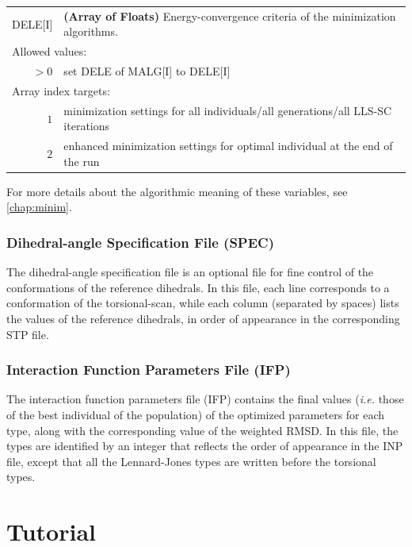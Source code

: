 \documentclass[10pt,a4paper,openany]{memoir}
\numberwithin{equation}{section}
\begin{document}
{
\begin{tabular}{r@{ : }l}
\label{descr:dele}
      DELE[I]&\textbf{(Array of Floats)} Energy-convergence criteria of the minimization algorithms.                                          \\ 
\multicolumn{2}{l}{Allowed values:} \\ 
    \(>0\)&set DELE of MALG[I] to DELE[I] \\ 
\multicolumn{2}{l}{Array index targets:} \\ 
     \(1\)&minimization settings for all individuals/all generations/all LLS-SC iterations \\
  \(2\)&enhanced minimization settings for optimal individual at the end of the run \\
\end{tabular}
\vspace{1ex}
}

\noindent For more details about the algorithmic meaning of these variables, see \autoref{chap:minim}.

\subsection{Dihedral-angle Specification File (SPEC)}
\label{sec:file-formats-spec}

The dihedral-angle specification file is an optional file for fine
control of the conformations of the reference dihedrals. In this file,
each line corresponds to a conformation of the torsional-scan, while
each column (separated by spaces) lists the values of the reference
dihedrals, in order of appearance in the corresponding STP file.

\subsection{Interaction Function Parameters File (IFP)}
\label{sec:file-formats-IFP}

The interaction function parameters file (IFP) contains the final
values (\textit{i.e.} those of the best individual of the population)
of the optimized parameters for each type, along with the
corresponding value of the weighted RMSD. In this file, the types are
identified by an integer that reflects the order of appearance in the
INP file, except that all the Lennard-Jones types are written before
the torsional types.


\chapter{Tutorial}
\label{chap:tutorial}
\end{document}
